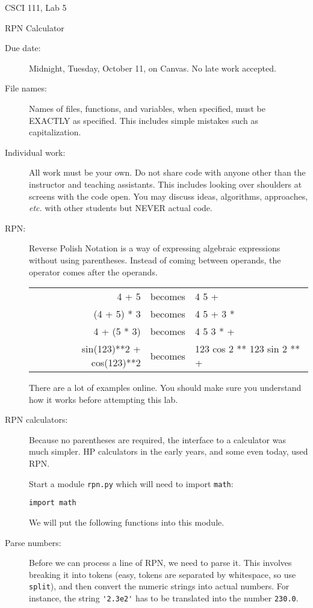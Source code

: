 \documentclass[12pt]{article}
\begin{document}
\sloppy
\centerline{\Large CSCI 111, Lab 5}
\centerline{\large RPN Calculator}

\begin{description}
\item[Due date:] Midnight, Tuesday, October 11, on Canvas.
No late work accepted.  

\item[File names:]  Names of files, functions, and variables, 
when specified,
must be EXACTLY as specified.  This includes simple mistakes such
as capitalization.

\item[Individual work:]  All work must be your own.  Do not share
code with anyone other than the instructor and teaching assistants.
This includes looking over shoulders at screens with the code open.
You may discuss ideas, algorithms, approaches, {\em etc.} with
other students but NEVER actual code.

\item[RPN:] Reverse Polish Notation is a way of expressing
algebraic expressions without using parentheses.
Instead of coming between operands, the operator comes
after the operands.

\begin{tabular}{rcl}
4 + 5 & becomes & 4 5 + \\
(4 + 5) * 3 & becomes & 4 5 + 3 * \\
4 + (5 * 3) & becomes & 4 5 3 * + \\
sin(123)**2 + cos(123)**2 & becomes & 123 cos 2 ** 123 sin 2 ** + \\
\end{tabular}

There are a lot of examples online.  You should make sure you understand
how it works before attempting this lab.

\item[RPN calculators:] Because no parentheses are required,
the interface to a calculator was much simpler.  HP calculators
in the early years, and some even today, used RPN.

Start a module \lstinline{rpn.py} which will need to import
\lstinline{math}:
\begin{lstlisting}
import math
\end{lstlisting}  
We will put the following functions into this module.

\item[Parse numbers:] Before we can process a line of RPN,
we need to parse it.  This involves breaking it into
tokens (easy, tokens are separated by whitespace, so use
{\tt split}), and then convert the numeric strings
into actual numbers.   For instance, the string \lstinline{'2.3e2'}
has to be translated into the number \lstinline{230.0}.


\end{description}
\end{document}
